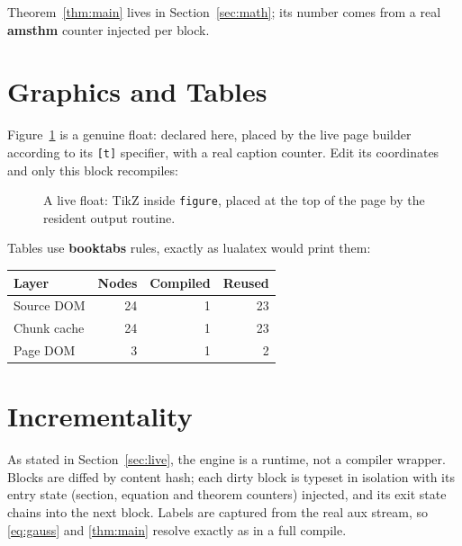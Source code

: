 \documentclass{article}
\newcommand{\term}[1]{\textbf{#1}}
\begin{document}
Theorem~\ref{thm:main} lives in Section~\ref{sec:math}; its number
comes from a real \term{amsthm} counter injected per block.

\section{Graphics and Tables}
\label{sec:graphics}

Figure~\ref{fig:plot} is a genuine float: declared here, placed by the
live page builder according to its \texttt{[t]} specifier, with a real
caption counter. Edit its coordinates and only this block recompiles:

\begin{figure}[t]
\centering
{}
\caption{A live float: TikZ inside \texttt{figure}, placed at the top of
the page by the resident output routine.}
\label{fig:plot}
\end{figure}

Tables use \term{booktabs} rules, exactly as lualatex would print them:

\begin{center}
\begin{tabular}{lrrr}
\toprule
Layer & Nodes & Compiled & Reused \\
\midrule
Source DOM   & 24 & 1 & 23 \\
Chunk cache  & 24 & 1 & 23 \\
Page DOM     & 3  & 1 & 2  \\
\bottomrule
\end{tabular}
\end{center}

\section{Incrementality}
\label{sec:inc}

As stated in Section~\ref{sec:live}, the engine is a runtime, not a
compiler wrapper. Blocks are diffed by content hash; each dirty block
is typeset in isolation with its entry state (section, equation and
theorem counters) injected, and its exit state chains into the next
block. Labels are captured from the real aux stream, so
\eqref{eq:gauss} and \ref{thm:main} resolve exactly as in a full
compile.
\end{document}
